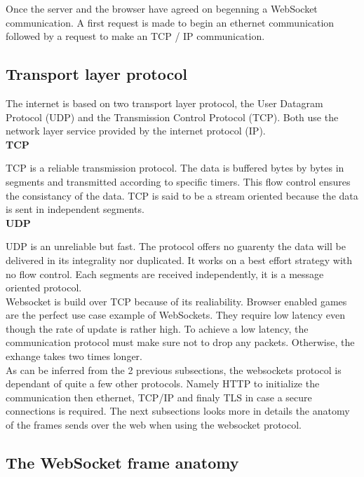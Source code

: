 Once the server and the browser have agreed on begenning a WebSocket
communication. A first request is made to begin an ethernet communication
followed by a request to make an TCP / IP communication.\\

\subsection{Transport layer protocol}

The internet is based on two transport layer protocol, the User Datagram
Protocol (UDP) and the Transmission Control Protocol (TCP). Both use the
network layer service provided by the internet protocol (IP). \\

\textbf{TCP}

TCP is a reliable transmission protocol. The data is buffered bytes by bytes in
segments and transmitted according to specific timers. This flow control
ensures the consistancy of the data. TCP is said to be a stream oriented
because the data is sent in independent segments.\\

\textbf{UDP}

UDP is an unreliable but fast. The protocol offers no guarenty the data will be
delivered in its integrality nor duplicated. It works on a best effort strategy
with no flow control. Each segments are received independently, it is a message
oriented protocol.\\

Websocket is build over TCP because of its realiability. Browser enabled games
are the perfect use case example of WebSockets. They require low latency even
though the rate of update is rather high. To achieve a low latency, the
communication protocol must make sure not to drop any packets. Otherwise, the
exhange takes two times longer.\\

As can be inferred from the 2 previous subsections, the websockets protocol is
dependant of quite a few other protocols. Namely HTTP to initialize the
communication then ethernet, TCP/IP and finaly TLS in case a secure connections
is required. The next subsections looks more in details the anatomy of the
frames sends over the web when using the websocket protocol.\\

\subsection{The WebSocket frame anatomy}

